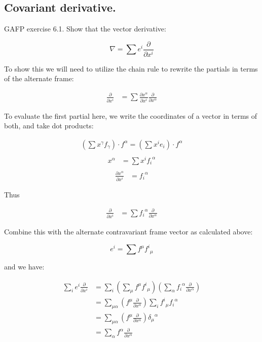 \documentclass{article}      %
\begin{document}
\subsection{ Covariant derivative. }

GAFP exercise 6.1.  Show that the vector derivative:

\begin{equation}
\nabla = \sum e^i \frac{\partial}{\partial x^i}
\end{equation}

To show this we will need to utilize the chain rule to rewrite the partials in terms of the alternate frame:

\begin{align*}
\frac{\partial}{\partial x^i} &= \sum \frac{\partial x^\alpha}{\partial x^i} \frac{\partial}{\partial x^\alpha} 
\end{align*}

To evaluate the first partial here, we write the coordinates of a vector in terms of both, and take dot products:

\begin{align*}
\left(\sum x^{\gamma} f_{\gamma}\right) \cdot f^{\alpha} = \left(\sum x^i e_i\right) \cdot f^{\alpha} \\
\end{align*}
\begin{align*}
x^{\alpha} &= \sum x^i {f_i}^{\alpha} \\
\end{align*}
\begin{align*}
\frac{\partial x^{\alpha}}{\partial x^i} &= {f_i}^{\alpha}
\end{align*}

Thus

\begin{align*}
\frac{\partial}{\partial x^i} &= \sum {f_i}^{\alpha} \frac{\partial}{\partial x^\alpha} 
\end{align*}

Combine this with the alternate contravariant frame vector as calculated above:

\[
e^i = \sum f^{\mu} {f^i}_{\mu}
\]

and we have:

\begin{align*}
\sum_i e^i \frac{\partial}{\partial x^i}
&= \sum_i \left(\sum_{\mu} f^{\mu} {f^i}_{\mu} \right) \left( \sum_{\alpha} {f_i}^{\alpha} \frac{\partial}{\partial x^\alpha}\right) \\
&= \sum_{\mu \alpha} \left(f^{\mu} \frac{\partial}{\partial x^\alpha} \right) \sum_i {f^i}_{\mu} {f_i}^{\alpha} \\
&= \sum_{\mu \alpha} \left(f^{\mu} \frac{\partial}{\partial x^\alpha} \right) {\delta_{\mu}}^{\alpha} \\
&= \sum_{\alpha} f^{\alpha} \frac{\partial}{\partial x^\alpha} \\
\end{align*}
\end{document}
